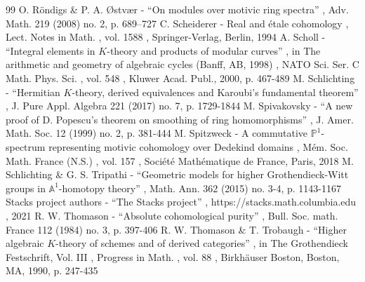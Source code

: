 \documentclass[11pt]{article}
\numberwithin{equation}{section}\renewcommand{\encodingdefault}{TU}
\theoremstyle{remark}
\theoremstyle{definition}
\numberwithin{equation}{thm}
\begin{document}
\begin{thebibliography}{99}
 O. Röndigs \& P. A. Østvær - “On modules over motivic ring spectra” , Adv. Math. 219 (2008) no. 2, p. 689–727
 C. Scheiderer - Real and étale cohomology , Lect. Notes in Math. , vol. 1588 , Springer-Verlag, Berlin, 1994
 A. Scholl - “Integral elements in $K$-theory and products of modular curves” , in The arithmetic and geometry of algebraic cycles (Banff, AB, 1998) , NATO Sci. Ser. C Math. Phys. Sci. , vol. 548 , Kluwer Acad. Publ., 2000, p. 467-489
 M. Schlichting - “Hermitian $K$-theory, derived equivalences and Karoubi’s fundamental theorem” , J. Pure Appl. Algebra 221 (2017) no. 7, p. 1729-1844
 M. Spivakovsky - “A new proof of D. Popescu’s theorem on smoothing of ring homomorphisms” , J. Amer. Math. Soc. 12 (1999) no. 2, p. 381-444
 M. Spitzweck - A commutative $\mathbb{P}^1$-spectrum representing motivic cohomology over Dedekind domains , Mém. Soc. Math. France (N.S.) , vol. 157 , Société Mathématique de France, Paris, 2018
 M. Schlichting \& G. S. Tripathi - “Geometric models for higher Grothendieck-Witt groups in $\mathbb{A}^1$-homotopy theory” , Math. Ann. 362 (2015) no. 3-4, p. 1143-1167
 Stacks project authors - “The Stacks project” , https://stacks.math.columbia.edu , 2021
 R. W. Thomason - “Absolute cohomological purity” , Bull. Soc. math. France 112 (1984) no. 3, p. 397-406
 R. W. Thomason \& T. Trobaugh - “Higher algebraic $K$-theory of schemes and of derived categories” , in The Grothendieck Festschrift, Vol. III , Progress in Math. , vol. 88 , Birkhäuser Boston, Boston, MA, 1990, p. 247-435
\end{thebibliography}
\end{document}
